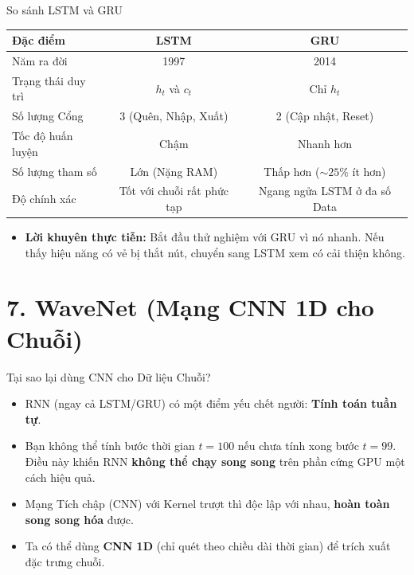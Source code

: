 \documentclass[aspectratio=169]{beamer}
\begin{document}
\begin{frame}{So sánh LSTM và GRU}
    \begin{table}[]
        \centering
        \begin{tabular}{|l|c|c|}
            \hline
            \textbf{Đặc điểm} & \textbf{LSTM} & \textbf{GRU} \\ \hline
            Năm ra đời & 1997 & 2014 \\ \hline
            Trạng thái duy trì & $h_t$ và $c_t$ & Chỉ $h_t$ \\ \hline
            Số lượng Cổng & 3 (Quên, Nhập, Xuất) & 2 (Cập nhật, Reset) \\ \hline
            Tốc độ huấn luyện & Chậm & Nhanh hơn \\ \hline
            Số lượng tham số & Lớn (Nặng RAM) & Thấp hơn ($\sim 25\%$ ít hơn) \\ \hline
            Độ chính xác & Tốt với chuỗi rất phức tạp & Ngang ngửa LSTM ở đa số Data \\ \hline
        \end{tabular}
    \end{table}
    \begin{itemize}
        \item \textbf{Lời khuyên thực tiễn:} Bắt đầu thử nghiệm với GRU vì nó nhanh. Nếu thấy hiệu năng có vẻ bị thắt nút, chuyển sang LSTM xem có cải thiện không.
    \end{itemize}
\end{frame}

\section{7. WaveNet (Mạng CNN 1D cho Chuỗi)}

\begin{frame}{Tại sao lại dùng CNN cho Dữ liệu Chuỗi?}
    \begin{itemize}
        \item RNN (ngay cả LSTM/GRU) có một điểm yếu chết người: \textbf{Tính toán tuần tự}.
        \item Bạn không thể tính bước thời gian $t=100$ nếu chưa tính xong bước $t=99$. Điều này khiến RNN \textbf{không thể chạy song song} trên phần cứng GPU một cách hiệu quả.
        \item Mạng Tích chập (CNN) với Kernel trượt thì độc lập với nhau, \textbf{hoàn toàn song song hóa} được.
        \item Ta có thể dùng \textbf{CNN 1D} (chỉ quét theo chiều dài thời gian) để trích xuất đặc trưng chuỗi.
    \end{itemize}
\end{frame}
\end{document}
